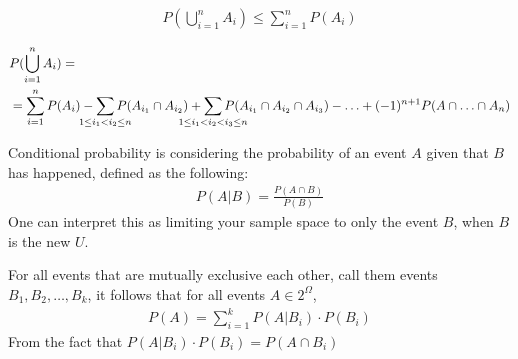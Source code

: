 \documentclass[a4paper]{article}
\theoremstyle{plain}
\newtheorem{thm}{Theorem}[section]
\theoremstyle{definition}
\newtheorem{defn}{Definition}[section]
\theoremstyle{remark}
\begin{document}
\begin{tcolorbox}[colback=black!3!white,colframe=black!60!white,title=\begin{thm}Union Bound \label{Union Bound}\end{thm}]
		\begin{align}
			P(\bigcup_{i=1}^n A_i) \le \sum_{i=1}^{n} P(A_i)
		\end{align}
\end{tcolorbox}
\begin{tcolorbox}[colback=black!3!white,colframe=black!60!white,title=\begin{thm}Inclusion - Exclusion Principle \label{Inclusion - Exclusion Principle}\end{thm}]
	
		\begin{align}
			&P(\bigcup_{i=1}^n A_i) = \\
			&= \sum_{i=1}^{n} P(A_i) - \sum_{\mathclap{1\le i_1< i_2\le n}} P(A_{i_1} \cap A_{i_2}) + \sum_{\mathclap{1\le i_1 < i_2 < i_3\le n}} P(A_{i_1}\cap A_{i_2} \cap A_{i_3}) - \ldots + (-1)^{n+1}P(A\cap \ldots\cap A_n)
		\end{align}
\end{tcolorbox}
\begin{tcolorbox}[colback=black!3!white,colframe=black!60!white,title=\begin{defn}Conditional Probability \label{Conditional Probability}\end{defn}]
Conditional probability is considering the probability of an event $A$ given that $B$ has happened, defined as the following:
\begin{align}
	P(A|B) = \frac{P(A \cap B)}{P(B)}
\end{align}
One can interpret this as limiting your sample space to only the event $B$, when $B$ is the new $U$.
\end{tcolorbox}
\begin{tcolorbox}[colback=black!3!white,colframe=black!60!white,title=\begin{thm}Law of total probability \label{Law of total probability}\end{thm}]
For all events that are mutually exclusive each other, call them events $B_1,B_2,\ldots,B_k$, it follows that for all events $A \in 2^{\Omega}$, 
		\begin{align}
			P(A) = \sum_{i=1}^{k} P(A | B_i) \cdot P(B_i)
		\end{align}
		From the fact that $P(A | B_i) \cdot P(B_i) = P(A \cap B_i)$
\end{tcolorbox}
\end{document}
